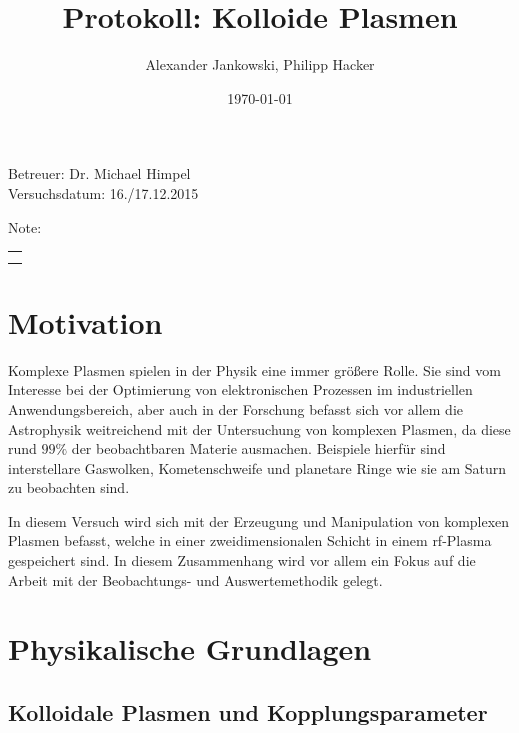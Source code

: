 \documentclass[numbers=noenddot,a4paper,notitlepage,twoside,BCOR15mm]{scrartcl}
\title{Protokoll: Kolloide Plasmen} %
\author{Alexander Jankowski, Philipp Hacker}
\date{\today}
\begin{document}
	\maketitle
	\begin{center}
		Betreuer: Dr. Michael Himpel\\ %
		Versuchsdatum: 16./17.12.2015 \\ %
		\begin{table}[h]
			\centering
			Note: %
			\begin{tabularx}{1.5cm}{|X|}
				\hline \\ \\
				\hline
			\end{tabularx}
		\end{table}
	\end{center}
	\vspace*{\fill}
	\tableofcontents
	\vfill
	\newpage
	\section{Motivation}
	
	Komplexe Plasmen spielen in der Physik eine immer größere Rolle. Sie sind vom Interesse bei der Optimierung von elektronischen Prozessen im industriellen Anwendungsbereich, aber auch in der Forschung befasst sich vor allem die Astrophysik weitreichend mit der Untersuchung von komplexen Plasmen, da diese rund $99\%$ der beobachtbaren Materie ausmachen. Beispiele hierfür sind interstellare Gaswolken, Kometenschweife und planetare Ringe wie sie am Saturn zu beobachten sind.
	
	In diesem Versuch wird sich mit der Erzeugung und Manipulation von komplexen Plasmen befasst, welche in einer zweidimensionalen Schicht in einem rf-Plasma gespeichert sind. In diesem Zusammenhang wird vor allem ein Fokus auf die Arbeit mit der Beobachtungs- und Auswertemethodik gelegt.

	\newpage
	\section{Physikalische Grundlagen}
	
	\subsection{Kolloidale Plasmen und Kopplungsparameter}
	
\end{document}
